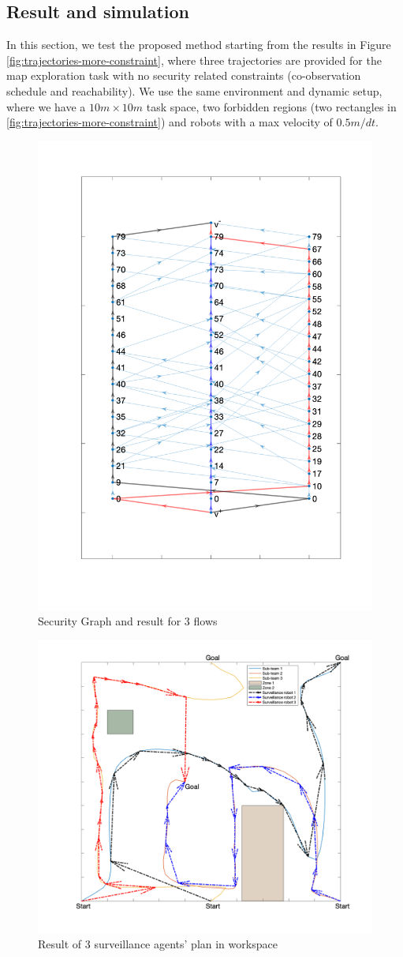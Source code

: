 \documentclass[journal]{IEEEtran}  %
\begin{document}
\subsection{Result and simulation}
In this section, we test the proposed method starting from the results in Figure \ref{fig:trajectories-more-constraint}, where three trajectories are provided for the map exploration task with no security related constraints (co-observation schedule and reachability). We use the same environment and dynamic setup, where we have a $10m\times10m$ task space, two forbidden regions (two rectangles in  \ref{fig:trajectories-more-constraint}) and robots with a max velocity of $0.5m/dt$.

\begin{figure}[t]
\begin{center}
\includegraphics[width=0.4\linewidth]{graph_flow_result_3}
\caption{Security Graph and result for 3 flows}
\label{fig:security-graph-3-flow}
\end{center}
\end{figure}

\begin{figure}[htbp]
\begin{center}
\includegraphics[width=0.6\linewidth]{3_flow_result}
\caption{Result of 3 surveillance agents' plan in workspace}
\label{fig:workspace-3-flow}
\end{center}
\end{figure}
\end{document}
